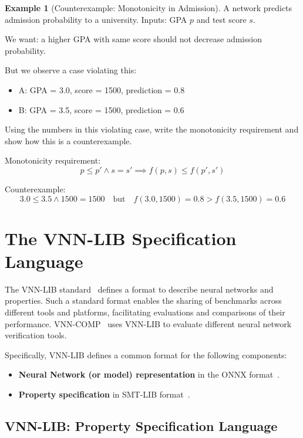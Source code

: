 \documentclass[oneside,11pt,dvipsnames]{book}
\numberwithin{equation}{section}
\theoremstyle{definition}
\newtheorem{example}{Example}[section]
\theoremstyle{remark}
\begin{document}
\begin{example}[Counterexample: Monotonicity in Admission]
A network predicts admission probability to a university. Inputs: GPA $p$ and test score $s$.

We want: a higher GPA with same score should not decrease admission probability.

But we observe a case violating this:
\begin{itemize}
 \item A: GPA = 3.0, score = 1500, prediction = 0.8
 \item B: GPA = 3.5, score = 1500, prediction = 0.6
\end{itemize}

Using the numbers in this violating case, write the monotonicity requirement and show how this is a counterexample.


Monotonicity requirement:
\[
p \leq p' \land s = s' \implies f(p,s) \leq f(p',s')
\]

Counterexample:
\[
3.0 \leq 3.5 \land 1500 = 1500 \quad \text{but} \quad f(3.0,1500)=0.8 > f(3.5,1500)=0.6
\]

\end{example}


\section{The VNN-LIB  Specification Language}\label{sec:vnnlib}


The VNN-LIB standard~\cite{demarchi2023supporting,vnnlib} defines a format to describe neural networks and properties. Such a standard format enables the sharing of benchmarks across different tools and platforms, facilitating evaluations and comparisons of their performance. VNN-COMP~\cite{brix2024fifth} uses VNN-LIB to evaluate different neural network verification tools.


Specifically, VNN-LIB defines a common format for the following components:
\begin{itemize}
    \item \textbf{Neural Network (or model) representation} in the ONNX format~\cite{onnx}.
    \item \textbf{Property specification} in SMT-LIB format~\cite{barrett2010smt}.
\end{itemize}



\subsection{VNN-LIB: Property Specification Language}
\end{document}
